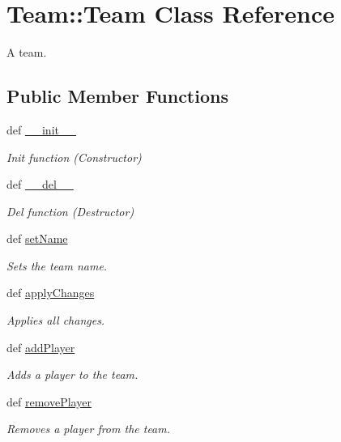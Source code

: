 \hypertarget{class_team_1_1_team}{
\section{\-Team\-:\-:\-Team \-Class \-Reference}
\label{class_team_1_1_team}
}


\-A team.  


\subsection*{\-Public \-Member \-Functions}
\begin{DoxyCompactItemize}
\item 
def \hyperlink{class_team_1_1_team_a5db02d839e143ee4411e226b3e2d6767}{\-\_\-\-\_\-init\-\_\-\-\_\-}
\begin{DoxyCompactList}\small\item\em \-Init function (\-Constructor) \end{DoxyCompactList}\item 
def \hyperlink{class_team_1_1_team_acaa24c8f13fc040907ab5372a6ae3aff}{\-\_\-\-\_\-del\-\_\-\-\_\-}
\begin{DoxyCompactList}\small\item\em \-Del function (\-Destructor) \end{DoxyCompactList}\item 
def \hyperlink{class_team_1_1_team_ad347f08ec5f4cff6dd7215fd88b5dcdf}{set\-Name}
\begin{DoxyCompactList}\small\item\em \-Sets the team name. \end{DoxyCompactList}\item 
def \hyperlink{class_team_1_1_team_ae73d93b09545c7c3e0f542a52f5aaf58}{apply\-Changes}
\begin{DoxyCompactList}\small\item\em \-Applies all changes. \end{DoxyCompactList}\item 
def \hyperlink{class_team_1_1_team_a844a9dfa443ac5499ba9eec977b88f08}{add\-Player}
\begin{DoxyCompactList}\small\item\em \-Adds a player to the team. \end{DoxyCompactList}\item 
def \hyperlink{class_team_1_1_team_a6616b0fe28af8685a161cfcb1a52a545}{remove\-Player}
\begin{DoxyCompactList}\small\item\em \-Removes a player from the team. \end{DoxyCompactList}\item 

\end{DoxyCompactItemize}
